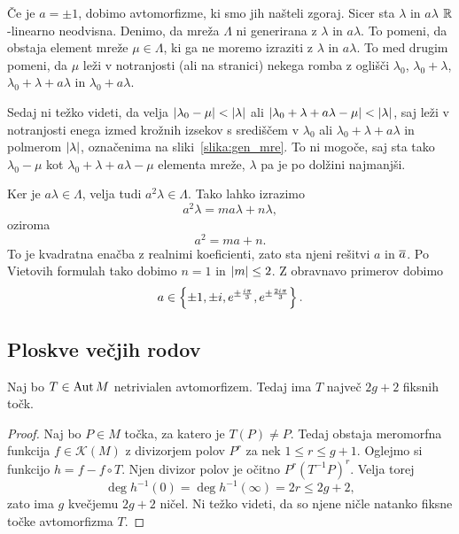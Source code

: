 Če je $a = \pm 1$, dobimo avtomorfizme, ki smo jih našteli zgoraj.
Sicer sta $\lambda$ in $a \lambda$ $\mathbb{R}$-linearno neodvisna. Denimo,
da mreža $\Lambda$ ni generirana z $\lambda$ in $a \lambda$. To
pomeni, da obstaja element mreže $\mu \in \Lambda$, ki ga ne moremo
izraziti z $\lambda$ in $a \lambda$. To med drugim pomeni, da $\mu$
leži v notranjosti (ali na stranici) nekega romba z oglišči
$\lambda_0$, $\lambda_0 + \lambda$,
$\lambda_0 + \lambda + a \lambda$ in $\lambda_0 + a \lambda$.



Sedaj ni težko videti, da velja
$\left\lvert \lambda_0 - \mu\right\rvert < \left\lvert \lambda\right\rvert$ ali
$\left\lvert \lambda_0 + \lambda + a \lambda - \mu\right\rvert < \left\lvert \lambda\right\rvert$, saj
leži v notranjosti enega izmed krožnih izsekov s središčem v
$\lambda_0$ ali $\lambda_0 + \lambda + a \lambda$ in polmerom
$\left\lvert \lambda\right\rvert$, označenima na sliki~\ref{slika:gen_mre}. To ni
mogoče, saj sta tako $\lambda_0 - \mu$ kot
$\lambda_0 + \lambda + a \lambda - \mu$ elementa mreže, $\lambda$
pa je po dolžini najmanjši.

Ker je $a \lambda \in \Lambda$, velja tudi
$a^2 \lambda \in \Lambda$. Tako lahko izrazimo
\[
a^2 \lambda = m a \lambda + n \lambda,
\]
oziroma
\[
a^2 = ma + n.
\]
To je kvadratna enačba z realnimi koeficienti, zato sta njeni
rešitvi $a$ in $\overline{a}$. Po Vietovih formulah tako dobimo $n=1$
in $\left\lvert m\right\rvert \leq 2$. Z obravnavo primerov dobimo
\[
a \in \left\{\pm 1, \pm i,
e^{\pm \frac{i \pi}{3}}, e^{\pm \frac{2i \pi}{3}}\right\}.
\]

\subsection{Ploskve večjih rodov}

\begin{trditev}
Naj bo $T \in \operatorname{Aut} M$ netrivialen avtomorfizem. Tedaj ima $T$
največ $2g + 2$ fiksnih točk.
\end{trditev}

\begin{proof}
Naj bo $P \in M$ točka, za katero je $T(P) \ne P$. Tedaj obstaja
meromorfna funkcija $f \in \mathscr{K}(M)$ z divizorjem polov
$P^r$ za nek $1 \leq r \leq g + 1$. Oglejmo si funkcijo
$h = f - f \circ T$. Njen divizor polov je očitno
$P^r (T^{-1}P)^r$. Velja torej
\[
\deg h^{-1}(0) = \deg h^{-1}(\infty) = 2r \leq 2g + 2,
\]
zato ima $g$ kvečjemu $2g + 2$ ničel. Ni težko videti, da so njene
ničle natanko fiksne točke avtomorfizma $T$.
\end{proof}

